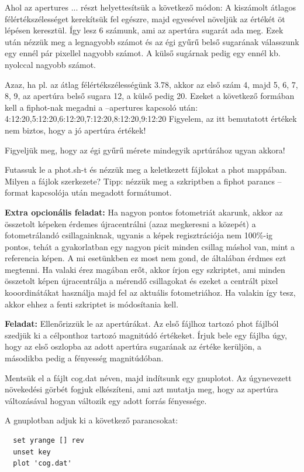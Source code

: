 \documentclass{article}
\begin{document}
Ahol az apertures ... részt helyettesítsük a következő módon:
A kiszámolt átlagos félértékszélességet kerekítsük fel egészre, majd egyesével
növeljük az értékét öt lépésen keresztül. Így lesz 6 számunk, ami az apertúra
sugarát ada meg. Ezek után nézzük meg a legnagyobb számot és az égi gyűrű belső
sugarának válasszunk egy ennél pár pixellel nagyobb számot. A külső sugárnak
pedig egy ennél kb. nyolccal nagyobb számot.

Azaz, ha pl. az átlag félértékszélességünk 3.78, akkor az első szám 4, majd 5,
6, 7, 8, 9, az apertúra belső sugara 12, a külső pedig 20.
Ezeket a következő formában kell a fiphot-nak megadni a --apertures kapcsoló
után:
4:12:20,5:12:20,6:12:20,7:12:20,8:12:20,9:12:20
Figyelem, az itt bemutatott értékek nem biztos, hogy a jó apertúra értékek!

Figyeljük meg, hogy az égi gyűrű mérete mindegyik aprtúrához ugyan akkora!

Futassuk le a phot.sh-t és nézzük meg a keletkezett fájlokat a phot mappában.
Milyen a fájlok szerkezete? Tipp: nézzük meg a szkriptben a fiphot parancs
--format kapcsolója után megadott formátumot.


{\bf Extra opcionális feladat:}
Ha nagyon pontos fotometriát akarunk, akkor az összetolt képeken érdemes
újracentrálni (azaz megkeresni a közepét) a fotometrálandó csillagainknak,
ugyanis a képek regisztrációja nem 100\%-ig pontos, tehát a gyakorlatban egy
nagyon picit minden csillag máshol van, mint a referencia képen. A mi
esetünkben ez most nem gond, de általában érdmes ezt megtenni.
Ha valaki érez magában erőt, akkor írjon egy szkriptet, ami minden összetolt
képen újracentrálja a mérendő csillagokat és ezeket a centrált pixel
kooordinátákat használja majd fel az aktuális fotometriához. Ha valakin így
tesz, akkor ehhez a fenti szkriptet is módosítania kell.


{\bf Feladat:}
Ellenőrizzük le az apertúrákat.
Az első fájlhoz tartozó phot fájlból szedjük ki a célponthoz tartozó
magnitúdó értékeket. Írjuk bele egy fájlba úgy, hogy az első oszlopba az adott
apertúra sugarának az értéke kerüljön, a másodikba pedig a fényesség
magnitúdóban.

Mentsük el a fájlt cog.dat néven, majd indítsunk egy gnuplotot. Az úgynevezett
növekedési görbét fogjuk elkészíteni, ami azt mutatja meg, hogy az apertúra
változásával hogyan változik egy adott forrás fényessége.

A gnuplotban adjuk ki a következő parancsokat:
\begin{verbatim}
  set yrange [] rev
  unset key
  plot 'cog.dat'
\end{verbatim}
\end{document}
